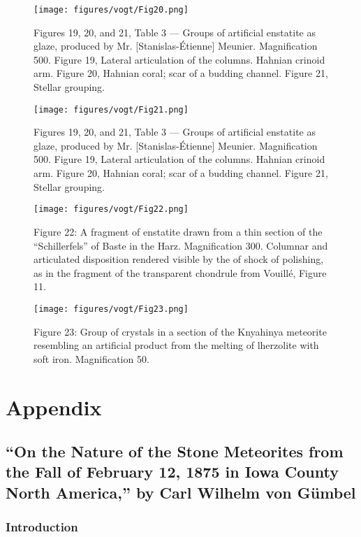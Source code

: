 \documentclass[a4paper, 12pt, oneside]{article}
\begin{document}
\clearpage
\begin{figure}[b]
\centering
\texttt{[image: figures/vogt/Fig20.png]}
\caption{Figures 19, 20, and 21, Table 3 --- Groups of artificial enstatite as glaze, produced by Mr. [Stanislas-Étienne] Meunier. Magnification 500. Figure 19, Lateral articulation of the columns. Hahnian crinoid arm. Figure 20, Hahnian coral; scar of a budding channel. Figure 21, Stellar grouping.}
\end{figure}
\clearpage
\begin{figure}[b]
\centering
\texttt{[image: figures/vogt/Fig21.png]}
\caption{Figures 19, 20, and 21, Table 3 --- Groups of artificial enstatite as glaze, produced by Mr. [Stanislas-Étienne] Meunier. Magnification 500. Figure 19, Lateral articulation of the columns. Hahnian crinoid arm. Figure 20, Hahnian coral; scar of a budding channel. Figure 21, Stellar grouping.}
\end{figure}
\clearpage
\begin{figure}[b]
\centering
\texttt{[image: figures/vogt/Fig22.png]}
\caption{Figure 22: A fragment of enstatite drawn from a thin section of the ``Schillerfels'' of Baste in the Harz. Magnification 300. Columnar and articulated disposition rendered visible by the of shock of polishing, as in the fragment of the transparent chondrule from Vouillé, Figure 11.}
\end{figure}
\clearpage
\begin{figure}[b]
\texttt{[image: figures/vogt/Fig23.png]}
\caption{Figure 23: Group of crystals in a section of the Knyahinya meteorite resembling an artificial product from the melting of lherzolite with soft iron. Magnification 50.}
\centering
\end{figure}
\clearpage
\pagestyle{plain}
\section{Appendix}
\subsection{``On the Nature of the Stone Meteorites from the Fall of February 12, 1875 in Iowa County North America,'' by Carl Wilhelm von Gümbel}
\subsubsection*{Introduction}
\end{document}
